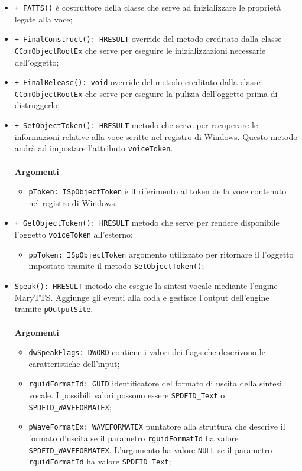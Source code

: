 \begin{itemize}
	\item \texttt{+ FATTS()} è costruttore della classe che serve ad inizializzare le proprietà legate alla voce;
	\item \texttt{+ FinalConstruct(): HRESULT} override del metodo ereditato dalla classe \texttt{CComObjectRootEx} che serve per eseguire le inizializzazioni necessarie dell'oggetto;
	\item \texttt{+ FinalRelease(): void} override del metodo ereditato dalla classe\\ \texttt{CComObjectRootEx} che serve per eseguire la pulizia dell'oggetto prima di distruggerlo;
	\item \texttt{+ SetObjectToken(): HRESULT} metodo che serve per recuperare le informazioni relative alla voce scritte nel registro di Windows. Questo metodo andrà ad impostare l'attributo \texttt{voiceToken}.\\\\
	\textbf{Argomenti}
	\begin{itemize}
		\item \texttt{pToken: ISpObjectToken} è il riferimento al token della voce contenuto nel registro di Windows. 
	\end{itemize}
	\item \texttt{+ GetObjectToken(): HRESULT} metodo che serve per rendere disponibile l'oggetto \texttt{voiceToken} all'esterno;
	\begin{itemize}
		\item \texttt{ppToken: ISpObjectToken} argomento utilizzato per ritornare il l'oggetto impostato tramite il metodo \texttt{SetObjectToken()};
	\end{itemize}
	\item \texttt{Speak(): HRESULT} metodo che esegue la sintesi vocale mediante l'engine MaryTTS. Aggiunge gli eventi alla coda e gestisce l'output dell'engine tramite \texttt{pOutputSite}.\\\\
	\textbf{Argomenti}
	\begin{itemize}
		\item \texttt{dwSpeakFlags: DWORD} contiene i valori dei flags che descrivono le caratteristiche dell'input;
		\item \texttt{rguidFormatId: GUID} identificatore del formato di uscita della sintesi vocale. I possibili valori possono essere \texttt{SPDFID\_Text} o\\\texttt{SPDFID\_WAVEFORMATEX};
		\item \texttt{pWaveFormatEx: WAVEFORMATEX} puntatore alla struttura che descrive il formato d'uscita se il parametro \texttt{rguidFormatId} ha valore\\\texttt{SPDFID\_WAVEFORMATEX}. L'argomento ha valore \texttt{NULL} se il parametro \texttt{rguidFormatId} ha valore \texttt{SPDFID\_Text};

\end{itemize}
\end{itemize}

